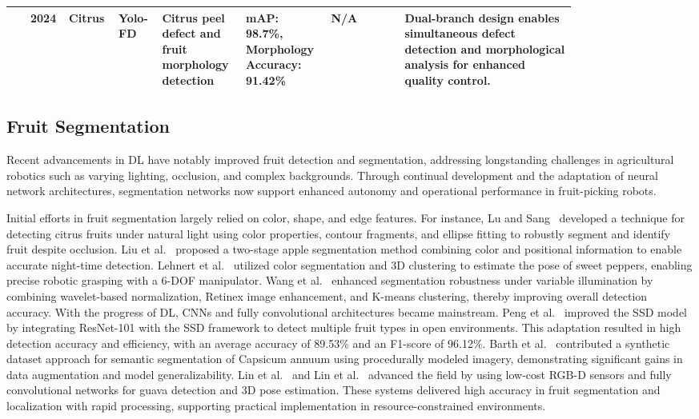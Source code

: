 \documentclass[a4paper,fleqn]{cas-dc}
\begin{document}
\begin{table}[H]
\begin{tabular}{p{0.03\linewidth} p{0.03\linewidth} p{0.06\linewidth} p{0.06\linewidth} p{0.12\linewidth} p{0.12\linewidth} p{0.12\linewidth} p{0.28\linewidth}}
\cite{LU2024108721} & 2024 & Citrus & Yolo-FD & Citrus peel defect and fruit morphology detection & mAP: 98.7\%, Morphology Accuracy: 91.42\% & N/A & Dual-branch design enables simultaneous defect detection and morphological analysis for enhanced quality control. \\ \bottomrule
\end{tabular}
\end{table}

\subsection{Fruit Segmentation}
Recent advancements in DL have notably improved fruit detection and segmentation, addressing longstanding challenges in agricultural robotics such as varying lighting, occlusion, and complex backgrounds. Through continual development and the adaptation of neural network architectures, segmentation networks now support enhanced autonomy and operational performance in fruit-picking robots.

Initial efforts in fruit segmentation largely relied on color, shape, and edge features. For instance, Lu and Sang~\cite{lu2015detecting} developed a technique for detecting citrus fruits under natural light using color properties, contour fragments, and ellipse fitting to robustly segment and identify fruit despite occlusion. Liu et al.~\cite{liu2016method} proposed a two-stage apple segmentation method combining color and positional information to enable accurate night-time detection. Lehnert et al.~\cite{lehnert2016sweet} utilized color segmentation and 3D clustering to estimate the pose of sweet peppers, enabling precise robotic grasping with a 6-DOF manipulator. Wang et al.~\cite{wang2017robust} enhanced segmentation robustness under variable illumination by combining wavelet-based normalization, Retinex image enhancement, and K-means clustering, thereby improving overall detection accuracy.
With the progress of DL, CNNs and fully convolutional architectures became mainstream. Peng et al.~\cite{peng2018general} improved the SSD model by integrating ResNet-101 with the SSD framework to detect multiple fruit types in open environments. This adaptation resulted in high detection accuracy and efficiency, with an average accuracy of 89.53\% and an F1-score of 96.12\%. Barth et al.~\cite{barth2018data} contributed a synthetic dataset approach for semantic segmentation of Capsicum annuum using procedurally modeled imagery, demonstrating significant gains in data augmentation and model generalizability.
Lin et al.~\cite{lin2019guava} and Lin et al.~\cite{lin2020color} advanced the field by using low-cost RGB-D sensors and fully convolutional networks for guava detection and 3D pose estimation. These systems delivered high accuracy in fruit segmentation and localization with rapid processing, supporting practical implementation in resource-constrained environments.
\end{document}
